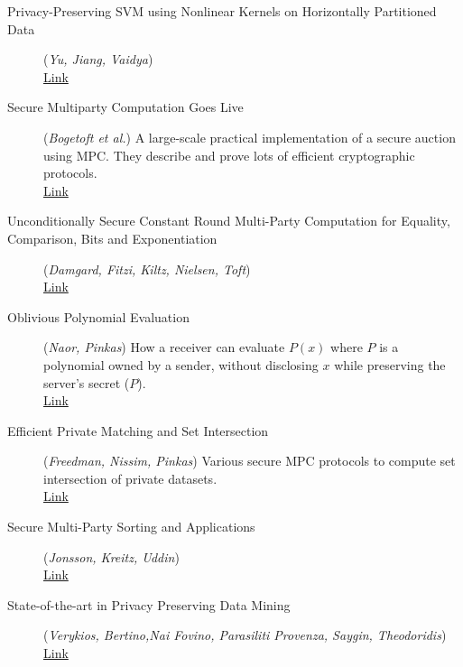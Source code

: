 \documentclass[11pt]{article}
\begin{document}
\begin{description}
	\item [Privacy-Preserving SVM using Nonlinear Kernels on Horizontally Partitioned Data] (\emph{Yu, Jiang, Vaidya})
	\\ \href{http://cimic.rutgers.edu/~jsvaidya/pub-papers/vaidyaSVM-sac06.pdf}{Link}
	                                         
	\item [Secure Multiparty Computation Goes Live](\emph{Bogetoft et al.}) A large-scale practical implementation of a secure auction using MPC. They describe and prove lots of efficient cryptographic protocols.  
	\\ \href{http://eprint.iacr.org/2008/068.pdf}{Link}
       
	\item [Unconditionally Secure Constant Round Multi-Party Computation for Equality, Comparison, Bits and Exponentiation](\emph{Damgard, Fitzi, Kiltz, Nielsen, Toft})
	\\ \href{http://www.iacr.org/cryptodb/archive/2006/TCC/3624/3624.pdf}{Link}
             
	\item [Oblivious Polynomial Evaluation](\emph{Naor, Pinkas}) How a receiver can evaluate $P(x)$ where $P$ is a polynomial owned by a sender, without disclosing $x$ while preserving the server's secret ($P$).
	\\ \href{http://citeseerx.ist.psu.edu/viewdoc/download?doi=10.1.1.73.7197&rep=rep1&type=pdf}{Link}
                                                                          
	\item [Efficient Private Matching and Set Intersection](\emph{Freedman, Nissim, Pinkas}) Various secure MPC protocols to compute set intersection of private datasets.
	\\ \href{http://www.cs.princeton.edu/~mfreed/docs/FNP04-pm.pdf}{Link}
	
	\item [Secure Multi-Party Sorting and Applications](\emph{Jonsson, Kreitz, Uddin})
	\\ \href{http://eprint.iacr.org/2011/122.pdf}{Link}
	                  
	\item [State-of-the-art in Privacy Preserving Data Mining](\emph{Verykios, Bertino,Nai Fovino, Parasiliti Provenza, Saygin, Theodoridis})
	\\ \href{http://www.sigmod.org/publications/sigmod-record/0403/B1.bertion-sigmod-record2.pdf}{Link}
\end{description}





\newpage





\end{document}
